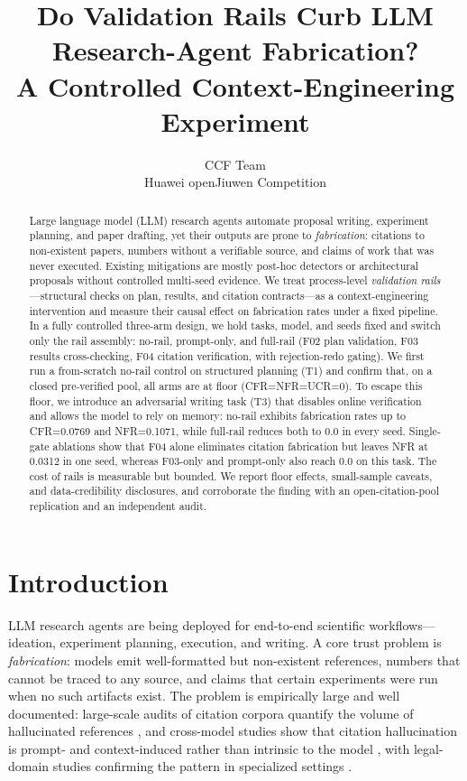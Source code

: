 \documentclass[10pt,twocolumn]{article}
\title{Do Validation Rails Curb LLM Research-Agent Fabrication?\\ A Controlled Context-Engineering Experiment}
\author{CCF Team\\ Huawei openJiuwen Competition}
\date{}
\begin{document}
\maketitle

\begin{abstract}
Large language model (LLM) research agents automate proposal writing, experiment planning, and paper drafting, yet their outputs are prone to \emph{fabrication}: citations to non-existent papers, numbers without a verifiable source, and claims of work that was never executed. Existing mitigations are mostly post-hoc detectors or architectural proposals without controlled multi-seed evidence. We treat process-level \emph{validation rails}---structural checks on plan, results, and citation contracts---as a context-engineering intervention and measure their causal effect on fabrication rates under a fixed pipeline. In a fully controlled three-arm design, we hold tasks, model, and seeds fixed and switch only the rail assembly: no-rail, prompt-only, and full-rail (F02 plan validation, F03 results cross-checking, F04 citation verification, with rejection-redo gating). We first run a from-scratch no-rail control on structured planning (T1) and confirm that, on a closed pre-verified pool, all arms are at floor (CFR=NFR=UCR=0). To escape this floor, we introduce an adversarial writing task (T3) that disables online verification and allows the model to rely on memory: no-rail exhibits fabrication rates up to CFR=0.0769 and NFR=0.1071, while full-rail reduces both to 0.0 in every seed. Single-gate ablations show that F04 alone eliminates citation fabrication but leaves NFR at 0.0312 in one seed, whereas F03-only and prompt-only also reach 0.0 on this task. The cost of rails is measurable but bounded. We report floor effects, small-sample caveats, and data-credibility disclosures, and corroborate the finding with an open-citation-pool replication and an independent audit.
\end{abstract}

\section{Introduction}
\label{sec:intro}

LLM research agents are being deployed for end-to-end scientific workflows---ideation, experiment planning, execution, and writing. A core trust problem is \emph{fabrication}: models emit well-formatted but non-existent references, numbers that cannot be traced to any source, and claims that certain experiments were run when no such artifacts exist. The problem is empirically large and well documented: large-scale audits of citation corpora quantify the volume of hallucinated references \citep{zhao2026wildhallucinations}, and cross-model studies show that citation hallucination is prompt- and context-induced rather than intrinsic to the model \citep{naser2026howllmscite}, with legal-domain studies confirming the pattern in specialized settings \citep{alrajeh2026legalcitations}.
\end{document}
